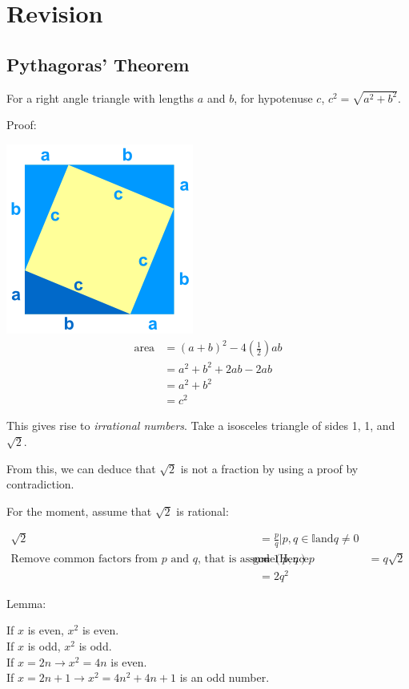 \chapter{Revision}

\section{Pythagoras' Theorem}
For a right angle triangle with lengths $a$ and $b$, for hypotenuse $c$,
$c^2 = \sqrt{a^2 + b^2}$.

Proof:

\includegraphics{img/pythagorean-theorem-proof.png}
\begin{align}
  \text{area}
    &= (a+b)^2 - 4(\frac{1}{2})ab \\
    &= a^2 + b^2 + 2ab - 2ab \\
    &= a^2 + b^2 \\
    &= c^2
\end{align}

This gives rise to \emph{irrational numbers}. Take a isosceles triangle of sides
1, 1, and $\sqrt{2}$.

From this, we can deduce that $\sqrt{2}$ is not a fraction by using a proof by
contradiction.

For the moment, assume that $\sqrt{2}$ is rational:

\begin{align}
  \sqrt{2} &= \frac{p}{q} | p,q \in \mathbb{I} \text{and} q \neq 0 \\
  \text{Remove common factors from $p$ and $q$, that is assume}
  \gcd(p,q) &= 1
  \text{Hence}
  p &= q\sqrt{2} \\
    &= 2q^2
\end{align}

Lemma:

If $x$ is even, $x^2$ is even. \\
If $x$ is odd, $x^2$ is odd. \\
If $x = 2n \to x^2 = 4n$ is even. \\
If $x = 2n + 1 \to x^2 = 4n^2 + 4n + 1$ is an odd number.

